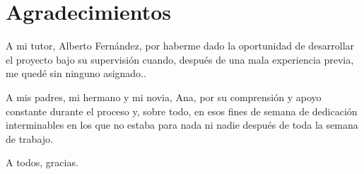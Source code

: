 \chapter{Agradecimientos}

A mi tutor, Alberto Fernández, por haberme dado la oportunidad de desarrollar el proyecto bajo su supervisión cuando, después de una mala experiencia previa, me quedé sin ninguno asignado..

A mis padres, mi hermano y mi novia, Ana, por su comprensión y apoyo constante durante el proceso y, sobre todo, en esos fines de semana de dedicación interminables en los que no estaba para nada ni nadie después de toda la semana de trabajo.

A todos, gracias.